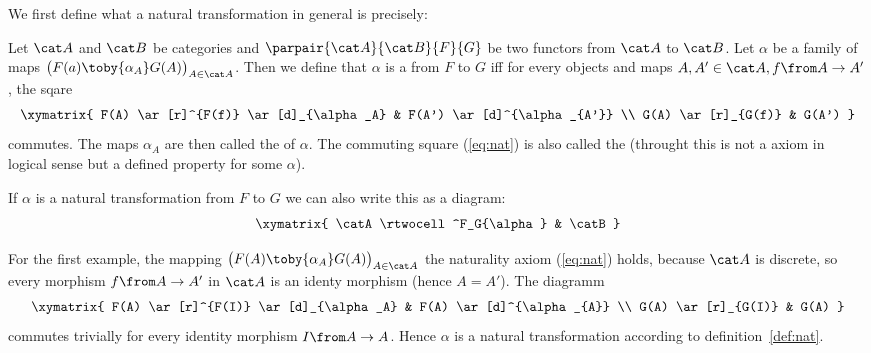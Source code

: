 We first define what a natural transformation in general is precisely:
\begin{defn}
  \label{def:nat}
  Let $\catA$ and $\catB$ be categories and $\parpair{\catA}{\catB}{F}{G}$ be two functors from $\catA$ to $\catB$.
  Let $\alpha$ be a family of maps
  $\bigl(F(a)\toby{\alpha_A}G(A)\bigr)_{A\in\catA}$.
  Then we define that $\alpha$ is a  from $F$ to $G$ iff
  for every objects and maps $A, A' \in \catA, f \from A \to A'$, the sqare
  \begin{equation}
    \label{eq:nat}
    \begin{array}{c}
      \xymatrix{
        F(A) \ar[r]^{F(f)} \ar[d]_{\alpha_A} & F(A') \ar[d]^{\alpha_{A'}} \\
        G(A) \ar[r]_{G(f)} & G(A')
      }
    \end{array}
  \end{equation}
  commutes.
  The maps $\alpha_A$ are then called the  of $\alpha$.
  The commuting square (\ref{eq:nat}) is also called the  (throught this is not a axiom in logical sense but a defined property for some $\alpha$).
\end{defn}

If $\alpha$ is a natural transformation from $F$ to $G$ we can also write this as a diagram:
\[\xymatrix{
  \catA \rtwocell^F_G{\alpha} & \catB
}\]

\begin{exmp}
  For the first example, the mapping
  $\bigl(F(A)\toby{\alpha_A}G(A)\bigr)_{A\in\catA}$
  the naturality axiom (\ref{eq:nat}) holds, because $\catA$ is discrete, so every morphism $f \from A \to A'$ in $\catA$ is an identy morphism (hence $A=A'$). The diagramm
  \[
    \xymatrix{
      F(A) \ar[r]^{F(I)} \ar[d]_{\alpha_A} & F(A) \ar[d]^{\alpha_{A}} \\
      G(A) \ar[r]_{G(I)} & G(A)
  }\]
  commutes trivially for every identity morphism $I \from A \to A$. Hence $\alpha$ is a natural transformation according to definition~\ref{def:nat}.
\end{exmp}

